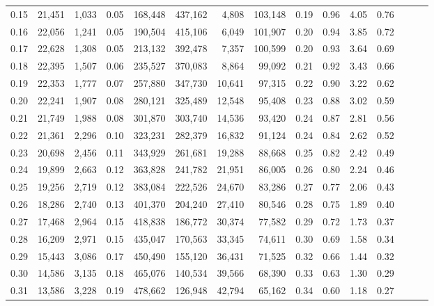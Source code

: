 \begin{tabular}{rrrrrrrrrrrrrrr}
0.15 &  21,451 &  1,033 &  0.05 &  168,448 &  437,162 &    4,808 &  103,148 &  0.19 &  0.96 &  4.05 &      0.76 \\
0.16 &  22,056 &  1,241 &  0.05 &  190,504 &  415,106 &    6,049 &  101,907 &  0.20 &  0.94 &  3.85 &      0.72 \\
0.17 &  22,628 &  1,308 &  0.05 &  213,132 &  392,478 &    7,357 &  100,599 &  0.20 &  0.93 &  3.64 &      0.69 \\
0.18 &  22,395 &  1,507 &  0.06 &  235,527 &  370,083 &    8,864 &   99,092 &  0.21 &  0.92 &  3.43 &      0.66 \\
0.19 &  22,353 &  1,777 &  0.07 &  257,880 &  347,730 &   10,641 &   97,315 &  0.22 &  0.90 &  3.22 &      0.62 \\
0.20 &  22,241 &  1,907 &  0.08 &  280,121 &  325,489 &   12,548 &   95,408 &  0.23 &  0.88 &  3.02 &      0.59 \\
0.21 &  21,749 &  1,988 &  0.08 &  301,870 &  303,740 &   14,536 &   93,420 &  0.24 &  0.87 &  2.81 &      0.56 \\
0.22 &  21,361 &  2,296 &  0.10 &  323,231 &  282,379 &   16,832 &   91,124 &  0.24 &  0.84 &  2.62 &      0.52 \\
0.23 &  20,698 &  2,456 &  0.11 &  343,929 &  261,681 &   19,288 &   88,668 &  0.25 &  0.82 &  2.42 &      0.49 \\
0.24 &  19,899 &  2,663 &  0.12 &  363,828 &  241,782 &   21,951 &   86,005 &  0.26 &  0.80 &  2.24 &      0.46 \\
0.25 &  19,256 &  2,719 &  0.12 &  383,084 &  222,526 &   24,670 &   83,286 &  0.27 &  0.77 &  2.06 &      0.43 \\
0.26 &  18,286 &  2,740 &  0.13 &  401,370 &  204,240 &   27,410 &   80,546 &  0.28 &  0.75 &  1.89 &      0.40 \\
0.27 &  17,468 &  2,964 &  0.15 &  418,838 &  186,772 &   30,374 &   77,582 &  0.29 &  0.72 &  1.73 &      0.37 \\
0.28 &  16,209 &  2,971 &  0.15 &  435,047 &  170,563 &   33,345 &   74,611 &  0.30 &  0.69 &  1.58 &      0.34 \\
0.29 &  15,443 &  3,086 &  0.17 &  450,490 &  155,120 &   36,431 &   71,525 &  0.32 &  0.66 &  1.44 &      0.32 \\
0.30 &  14,586 &  3,135 &  0.18 &  465,076 &  140,534 &   39,566 &   68,390 &  0.33 &  0.63 &  1.30 &      0.29 \\
0.31 &  13,586 &  3,228 &  0.19 &  478,662 &  126,948 &   42,794 &   65,162 &  0.34 &  0.60 &  1.18 &      0.27 \\

\end{tabular}
